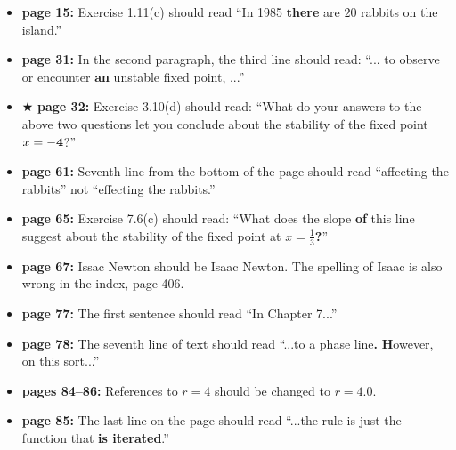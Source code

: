 \documentclass[12pt]{article}
\begin{document}
\begin{itemize}

  \item {\bf page 15:} Exercise 1.11(c) should read ``In 1985 {\bf
    there} are $20$ rabbits on the island.'' 

  \item {\bf page 31:}  In the second paragraph, the third line should
    read: ``... to observe or encounter {\bf an} unstable fixed point,
    ...''

  \item $\bigstar$ {\bf page 32:}  Exercise 3.10(d) should read:
    ``What do your answers to the above two questions let you conclude
    about the stability of the fixed point $x= {\bf -4}$?''



  \item {\bf page 61:} Seventh line from the bottom of the page should
    read ``affecting the rabbits'' not ``effecting the rabbits.''

  \item {\bf page 65:} Exercise 7.6(c) should read: ``What does the
    slope {\bf of} this line suggest about the stability of the fixed
    point at $x=\frac{1}{3}${\bf ?}''

  \item {\bf page 67:}  Issac Newton should be Isaac Newton.  The
    spelling of Isaac is also wrong in the index, page 406.

  \item {\bf page 77:}  The first sentence should read ``In Chapter
    7...'' 

  \item {\bf page 78:}  The seventh line of text should read ``...to a
    phase line{\bf .} {\bf H}owever, on this sort...''

  \item {\bf pages 84--86:} References to $r=4$ should be changed to
    $r=4.0$. 

  \item {\bf page 85:}  The last line on the page should read ``...the
    rule is just the function that {\bf is iterated}.''


\end{itemize}
\end{document}
